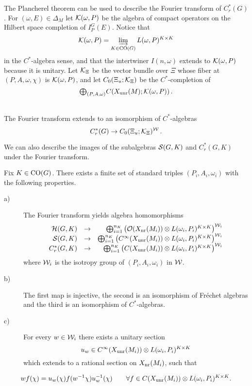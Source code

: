 The Plancherel theorem can be used to describe the Fourier transform of
$C_r^* (G)$. For $(\omega,E) \in \Delta_M$ let $\mathcal K (\omega ,P)$
be the algebra of compact operators on the Hilbert space
completion of $I_P^G (E)$. Notice that
\begin{equation}
\mathcal K (\omega ,P) = \varinjlim_{K \in \mathrm{CO}(G)} L (\omega ,P)^{K
\times K}
\end{equation}
in the $C^*$-algebra sense, and that the intertwiner $I (n,
\omega)$ extends to $\mathcal K (\omega ,P)$ because it is unitary. Let
$\mathcal K_\Xi$ be the vector bundle over $\Xi$ whose fiber at
$(P,A,\omega ,\chi )$ is $\mathcal K (\omega ,P)$, and let $C_0 (\Xi_u ;
\mathcal K_\Xi )$ be the $C^*$-completion of
\[
{\textstyle \bigoplus_{(P,A,\omega)} } C (X_{\mathrm{unr}} (M) ; \mathcal K (\omega ,P)) \,.
\]
\begin{thm}\label{thm:2.6} \textup{\cite[Theorem 2.5]{Ply}} \\
The Fourier transform extends to an isomorphism of $C^*$-algebras
\[
C_r^* (G) \to C_0 (\Xi_u ; \mathcal K_\Xi )^\mathcal W \,.
\]
\end{thm}

We can also describe the images of the subalgebras $\mathcal S (G,K)$
and $C_r^* (G,K)$ under the Fourier transform.

\begin{thm}\label{thm:2.7}
Fix $K \in \mathrm{CO}(G)$. There exists a finite set of standard triples 
$(P_i ,A_i ,\omega_i )$ with the following properties.
\begin{description}
\item[a)] The Fourier transform yields algebra homomorphisms
\[
\begin{array}{rrr}
\mathcal H (G,K) & \to & \bigoplus_{i=1}^{n_K}
  \big( \mathcal O (X_{\mathrm{nr}} (M_i )) \otimes L(\omega_i ,P_i
  )^{K \times K} \big)^{\mathcal W_i} \\
\mathcal S (G,K) & \to & \bigoplus_{i=1}^{n_K}
  \big( C^\infty (X_{\mathrm{unr}} (M_i )) \otimes L(\omega_i ,P_i
  )^{K \times K} \big)^{\mathcal W_i} \\
C_r^* (G,K) & \to & \bigoplus_{i=1}^{n_K}
  \big( C (X_{\mathrm{unr}} (M_i )) \otimes L(\omega_i ,P_i )^{K \times K} \big)^{\mathcal W_i}
\end{array}
\]
where $\mathcal W_i$ is the isotropy group of $(P_i ,A_i ,\omega_i )$
in $\mathcal W$.
\item[b)] The first map is injective, the second is an isomorphism of Fr\'echet 
algebras and the third is an isomorphism of $C^*$-algebras.
\item[c)] For every $w \in \mathcal W_i$ there exists a unitary section
\[
u_w \in C^\infty (X_{\mathrm{unr}} (M_i )) \otimes L(\omega_i ,P_i )^{K
\times K}
\]
which extends to a rational section on $X_{\mathrm{nr}} (M_i )$, such that
\end{description}
\begin{equation}\label{eq:2.7}
w f (\chi ) = u_w (\chi ) f (w^{-1} \chi ) u_w^{-1}(\chi ) \qquad
\forall f \in C (X_{\mathrm{unr}} (M_i )) \otimes L(\omega_i ,P_i )^{K
\times K} .
\end{equation}
\end{thm}

